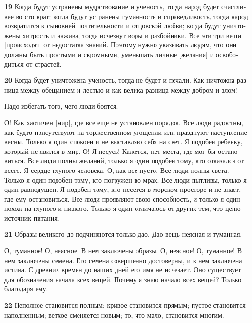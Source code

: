\documentclass[a4paper]{article}
\begin{document}
{\ttfamily
\foreignlanguage{russian}{\textrm{\textbf{19}}}\foreignlanguage{russian}{\textrm{ Когда будут устранены мудрствование и
ученость, тогда народ будет счастливее во сто крат; }}\foreignlanguage{russian}{\textrm{когда будут устранены
гуманность и справедливость, тогда народ возвратится к сыновней почтительности и отцовской любви; когда будут
уничтожены хитрость и нажива, тогда исчезнут воры и разбойники. Все эти три вещи [происходят] от недостатка знаний.
Поэтому нужно указывать людям, что они должны быть простыми и скромными, уменьшать личные [желания] и освободиться от
страстей.}}}

{\ttfamily
\foreignlanguage{russian}{\textrm{\textbf{20}}}\foreignlanguage{russian}{\textrm{ Когда будет уничтожена ученость, тогда
не будет и печали. Как ничтожна разница между обещанием и лестью и как велика разница между добром и злом!}}}

{
Надо избегать того, чего люди боятся.}

{\ttfamily
\foreignlanguage{russian}{\textrm{О! Как хаотичен [мир], где все еще не установлен порядок. Все люди радостны, как будто
присутствуют на торжественном угощении или празднуют наступление весны. Только я один спокоен и не выставляю себя на
свет. Я подобен ребенку, который не явился в мир. О! Я несусь! Кажется, нет места, где мог бы остановиться. Все люди
полны желаний, только я один подобен тому, кто отказался от всего. Я сердце глупого человека. О, как все пусто. Все
люди полны света. Только я один подобен тому, кто погружен во мрак. Все люди пытливы, только я один равнодушен. Я
подобен тому, кто несется в морском просторе и не знает, где ему остановиться. Все люди проявляют свою способность, и
только я один похож на глупого и низкого. Только я один отличаюсь от других тем, что ценю источник питания.}}}

{\ttfamily
\foreignlanguage{russian}{\textrm{\textbf{21}}}\foreignlanguage{russian}{\textrm{ Образы великого дэ подчиняются только
дао. Дао вещь неясная и туманная.}}}

{
О, туманное! О, неясное! В нем заключены образы. О, неясное! О, туманное! В нем заключены семена. Его семена совершенно
достоверны, и в нем заключена истина. С древних времен до наших дней его имя не исчезает. Оно существует для
обозначения начала всех вещей. Почему я знаю начало всех вещей? Только благодаря ему.}

{\ttfamily
\foreignlanguage{russian}{\textrm{\textbf{22}}}\foreignlanguage{russian}{\textrm{ Неполное становится полным; кривое
становится прямым; пустое становится наполненным; ветхое сменяется новым; то, что мало, становится многим.}}}
\end{document}
